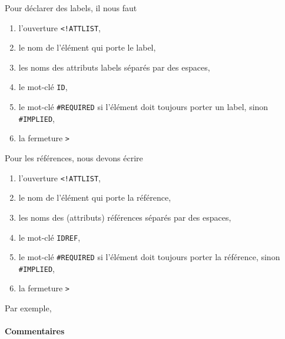 Pour déclarer des labels, il nous faut
\begin{enumerate}

  \item l'ouverture \verb|<!ATTLIST|,

  \item le nom de l'élément qui porte le label,

  \item les noms des attributs labels séparés par des espaces,

  \item le mot-clé \texttt{ID},

  \item le mot-clé \texttt{\#REQUIRED} si l'élément doit toujours
    porter un label, sinon \texttt{\#IMPLIED},

  \item la fermeture \verb|>|

\end{enumerate}
Pour les références, nous devons écrire
\begin{enumerate}

  \item l'ouverture \verb|<!ATTLIST|,

  \item le nom de l'élément qui porte la référence,

  \item les noms des (attributs) références séparés par des espaces,

  \item le mot-clé \texttt{IDREF},

  \item le mot-clé \texttt{\#REQUIRED} si l'élément doit toujours
    porter la référence, sinon \texttt{\#IMPLIED},

  \item la fermeture \verb|>|

\end{enumerate}
Par exemple,
\label{xml_intro_id_idref}

\paragraph{Commentaires}


